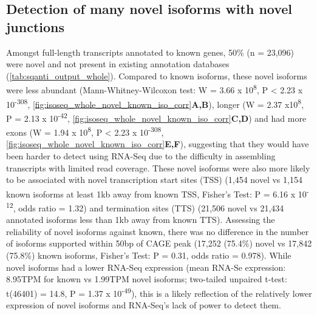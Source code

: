 \subsection{Detection of many novel isoforms with novel junctions}
\label{sec:whole_novelIso}
Amongst full-length transcripts annotated to known genes, 50\% (n = 23,096) were novel and not present in existing annotation databases (\cref{tab:sqanti_output_whole}). Compared to known isoforms, these novel isoforms were less abundant (Mann-Whitney-Wilcoxon test: W = 3.66 x 10\textsuperscript{8}, P < 2.23 x 10\textsuperscript{-308}, \cref{fig:isoseq_whole_novel_known_iso_corr}\textbf{A,B}), longer (W = 2.37 x10\textsuperscript{8}, P = 2.13 x 10\textsuperscript{-42}, \cref{fig:isoseq_whole_novel_known_iso_corr}\textbf{C,D}) and had more exons (W = 1.94 x 10\textsuperscript{8}, P < 2.23 x 10\textsuperscript{-308}, \cref{fig:isoseq_whole_novel_known_iso_corr}\textbf{E,F}), suggesting that they would have been harder to detect using RNA-Seq due to the difficulty in assembling transcripts with limited read coverage. These novel isoforms were also more likely to be associated with novel transcription start sites (TSS) (1,454 novel vs 1,154 known isoforms at least 1kb away from known TSS, Fisher's Test: P = 6.16 x 10\textsuperscript{-12}, odds ratio = 1.32) and termination sites (TTS) (21,506 novel vs 21,434 annotated isoforms less than 1kb away from known TTS). Assessing the reliability of novel isoforms against known, there was no difference in the number of isoforms supported within 50bp of CAGE peak (17,252 (75.4\%) novel vs 17,842 (75.8\%) known isoforms, Fisher's Test: P = 0.31, odds ratio = 0.978). While novel isoforms had a lower RNA-Seq expression (mean RNA-Se expression: 8.95TPM for known vs 1.99TPM novel isoforms; two-tailed unpaired t-test: t(46401) = 14.8, P = 1.37 x 10\textsuperscript{-49}), this is a likely reflection of the relatively lower expression of novel isoforms and RNA-Seq's lack of power to detect them.

